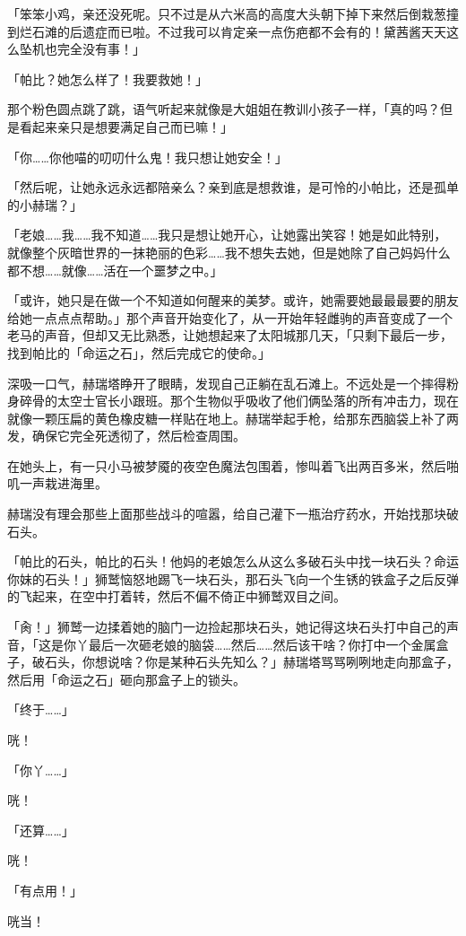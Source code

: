 「笨笨小鸡，亲还没死呢。只不过是从六米高的高度大头朝下掉下来然后倒栽葱撞到烂石滩的后遗症而已啦。不过我可以肯定亲一点伤疤都不会有的！黛茜酱天天这么坠机也完全没有事！」

「帕比？她怎么样了！我要救她！」

那个粉色圆点跳了跳，语气听起来就像是大姐姐在教训小孩子一样，「真的吗？但是看起来亲只是想要满足自己而已嘛！」

「你……你他喵的叨叨什么鬼！我只想让她安全！」

「然后呢，让她永远永远都陪亲么？亲到底是想救谁，是可怜的小帕比，还是孤单的小赫瑞？」

「老娘……我……我不知道……我只是想让她开心，让她露出笑容！她是如此特别，就像整个灰暗世界的一抹艳丽的色彩……我不想失去她，但是她除了自己妈妈什么都不想……就像……活在一个噩梦之中。」

「或许，她只是在做一个不知道如何醒来的美梦。或许，她需要她最最最要的朋友给她一点点点帮助。」那个声音开始变化了，从一开始年轻雌驹的声音变成了一个老马的声音，但却又无比熟悉，让她想起来了太阳城那几天，「只剩下最后一步，找到帕比的「命运之石」，然后完成它的使命。」

深吸一口气，赫瑞塔睁开了眼睛，发现自己正躺在乱石滩上。不远处是一个摔得粉身碎骨的太空士官长小跟班。那个生物似乎吸收了他们俩坠落的所有冲击力，现在就像一颗压扁的黄色橡皮糖一样贴在地上。赫瑞举起手枪，给那东西脑袋上补了两发，确保它完全死透彻了，然后检查周围。

在她头上，有一只小马被梦魇的夜空色魔法包围着，惨叫着飞出两百多米，然后啪叽一声栽进海里。

赫瑞没有理会那些上面那些战斗的喧嚣，给自己灌下一瓶治疗药水，开始找那块破石头。

「帕比的石头，帕比的石头！他妈的老娘怎么从这么多破石头中找一块石头？命运你妹的石头！」狮鹫恼怒地踢飞一块石头，那石头飞向一个生锈的铁盒子之后反弹的飞起来，在空中打着转，然后不偏不倚正中狮鹫双目之间。

「肏！」狮鹫一边揉着她的脑门一边捡起那块石头，她记得这块石头打中自己的声音，「这是你丫最后一次砸老娘的脑袋……然后……然后该干啥？你打中一个金属盒子，破石头，你想说啥？你是某种石头先知么？」赫瑞塔骂骂咧咧地走向那盒子，然后用「命运之石」砸向那盒子上的锁头。

「终于……」

咣！

「你丫……」

咣！

「还算……」

咣！

「有点用！」

咣当！


